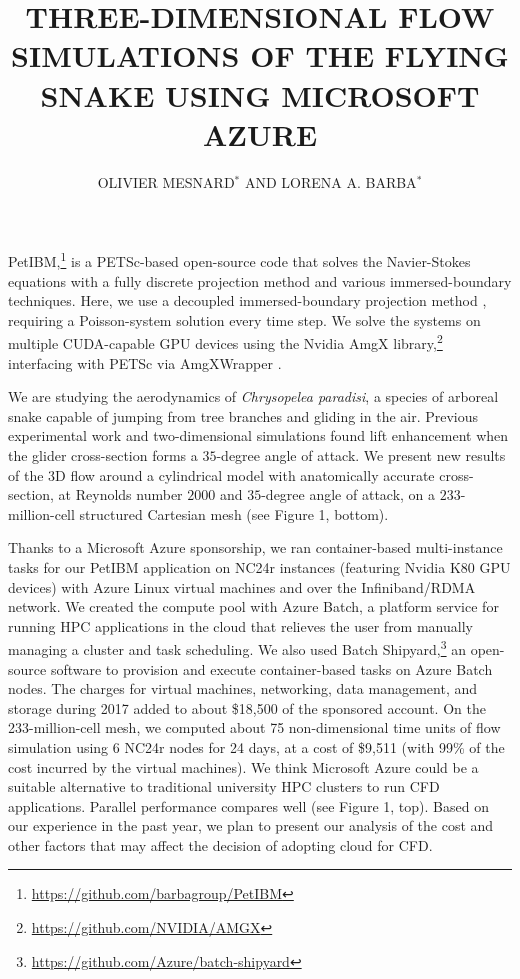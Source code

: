 \documentclass{parcfd2018}
\title{THREE-DIMENSIONAL FLOW SIMULATIONS OF THE FLYING SNAKE USING MICROSOFT AZURE}
\author{OLIVIER MESNARD$^{*}$ AND LORENA A. BARBA$^{*}$}
\begin{document}

PetIBM,\footnote{\url{https://github.com/barbagroup/PetIBM}} is a PETSc-based open-source code that solves the Navier-Stokes equations with a fully discrete projection method and various immersed-boundary techniques.
Here, we use a decoupled immersed-boundary projection method \cite{Li_et_al_2016}, requiring a Poisson-system solution every time step.
We solve the systems on multiple CUDA-capable GPU devices using the Nvidia AmgX library,\footnote{\url{https://github.com/NVIDIA/AMGX}} interfacing with PETSc via AmgXWrapper \cite{AmgXWrapper}.

We are studying the aerodynamics of \textit{Chrysopelea paradisi}, a species of arboreal snake capable of jumping from tree branches and gliding in the air.
Previous experimental work \cite{Holden_et_al_2014} and two-dimensional simulations \cite{Krishnan_et_al_2014, Mesnard_Barba_2017} found lift enhancement when the glider cross-section forms a $35$-degree angle of attack.
We present new results of the 3D flow around a cylindrical model with anatomically accurate cross-section, at Reynolds number $2000$ and $35$-degree angle of attack, on a  $233$-million-cell structured Cartesian mesh (see Figure 1, bottom).

Thanks to a Microsoft Azure sponsorship, we ran container-based multi-instance tasks for our PetIBM application on NC24r instances (featuring Nvidia K80 GPU devices) with Azure Linux virtual machines and over the Infiniband/RDMA network.
We created the compute pool with Azure Batch, a platform service for running HPC applications in the cloud that relieves the user from manually managing a cluster and task scheduling.
We also used Batch Shipyard,\footnote{\url{https://github.com/Azure/batch-shipyard}} an open-source software to provision and execute container-based tasks on Azure Batch nodes.
The charges for virtual machines, networking, data management, and storage during 2017 added to about \$18,500 of the sponsored account.
On the 233-million-cell mesh, we computed about 75 non-dimensional time units of flow simulation using 6 NC24r nodes for 24 days, at a cost of \$9,511 (with 99\% of the cost incurred by the virtual machines).
We think Microsoft Azure could be a suitable alternative to traditional university HPC clusters to run CFD applications.
Parallel performance compares well (see Figure 1, top).
Based on our experience in the past year, we plan to present our analysis of the cost and other factors that may affect the decision of adopting cloud for CFD.
\end{document}
